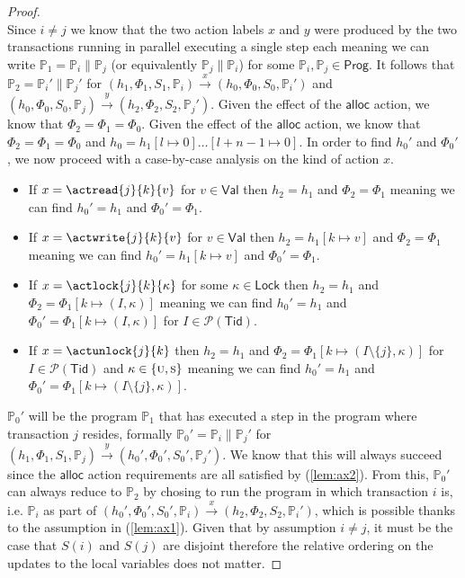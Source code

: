 \begin{lem}
\begin{proof}
\[	\]
	Since $i \neq j$ we know that the two action labels $x$ and $y$ were produced by the two transactions running in parallel executing a single step each meaning we can write $\mathds{P}_1 = \mathds{P}_i \| \mathds{P}_j$ (or equivalently $\mathds{P}_j \| \mathds{P}_i$) for some $\mathds{P}_i, \mathds{P}_j \in \mathsf{Prog}$. It follows that $\mathds{P}_2 = \mathds{P}_i' \| \mathds{P}_j'$ for $(h_1, \Phi_1, S_1, \mathds{P}_i) \xrightarrow{x} (h_0, \Phi_0, S_0, \mathds{P}_i')$ and $(h_0, \Phi_0, S_0, \mathds{P}_j) \xrightarrow{y} (h_2, \Phi_2, S_2, \mathds{P}_j')$. Given the effect of the $\mathsf{alloc}$ action, we know that $\Phi_2 = \Phi_1 = \Phi_0$. Given the effect of the $\mathsf{alloc}$ action, we know that $\Phi_2 = \Phi_1 = \Phi_0$ and $h_0 = h_1[l \mapsto 0]\ldots[l + n - 1 \mapsto 0]$. In order to find $h_0'$ and $\Phi_0'$, we now proceed with a case-by-case analysis on the kind of action $x$.
	\begin{itemize}
		\item If $x = \actread{j}{k}{v}$ for $v \in \mathsf{Val}$ then $h_2 = h_1$ and $\Phi_2 = \Phi_1$ meaning we can find $h_0' = h_1$ and $\Phi_0' = \Phi_1$.
		
		\item If $x = \actwrite{j}{k}{v}$ for $v \in \mathsf{Val}$ then $h_2 = h_1[k \mapsto v]$ and $\Phi_2 = \Phi_1$ meaning we can find $h_0' = h_1[k \mapsto v]$ and $\Phi_0' = \Phi_1$.
		
		\item If $x = \actlock{j}{k}{\kappa}$ for some $\kappa \in \mathsf{Lock}$ then $h_2 = h_1$ and $\Phi_2 = \Phi_1[k \mapsto (I, \kappa)]$ meaning we can find $h_0' = h_1$ and $\Phi_0' = \Phi_1[k \mapsto (I, \kappa)]$ for $I \in \mathcal{P}(\mathsf{Tid})$.
		
		\item If $x = \actunlock{j}{k}$ then $h_2 = h_1$ and $\Phi_2 = \Phi_1[k \mapsto (I \setminus \{j\}, \kappa)]$ for $I \in \mathcal{P}(\mathsf{Tid})$ and $\kappa \in \{\textsc{u}, \textsc{s}\}$ meaning we can find $h_0' = h_1$ and $\Phi_0' = \Phi_1[k \mapsto (I \setminus \{j\}, \kappa)]$.
	\end{itemize}
	$\mathds{P}_0'$ will be the program $\mathds{P}_1$ that has executed a step in the program where transaction $j$ resides, formally $\mathds{P}_0' = \mathds{P}_i \| \mathds{P}_j'$ for $(h_1, \Phi_1, S_1, \mathds{P}_j) \xrightarrow{y} (h_0', \Phi_0', S_0', \mathds{P}_j')$. We know that this will always succeed since the $\mathsf{alloc}$ action requirements are all satisfied by (\ref{lem:ax2}). From this, $\mathds{P}_0'$ can always reduce to $\mathds{P}_2$ by chosing to run the program in which transaction $i$ is, i.e. $\mathds{P}_i$ as part of $(h_0', \Phi_0', S_0', \mathds{P}_i) \xrightarrow{x} (h_2, \Phi_2, S_2, \mathds{P}_i')$, which is possible thanks to the assumption in (\ref{lem:ax1}). Given that by assumption $i \neq j$, it must be the case that $S(i)$ and $S(j)$ are disjoint therefore the relative ordering on the updates to the local variables does not matter.
	\end{proof}
\end{lem}

